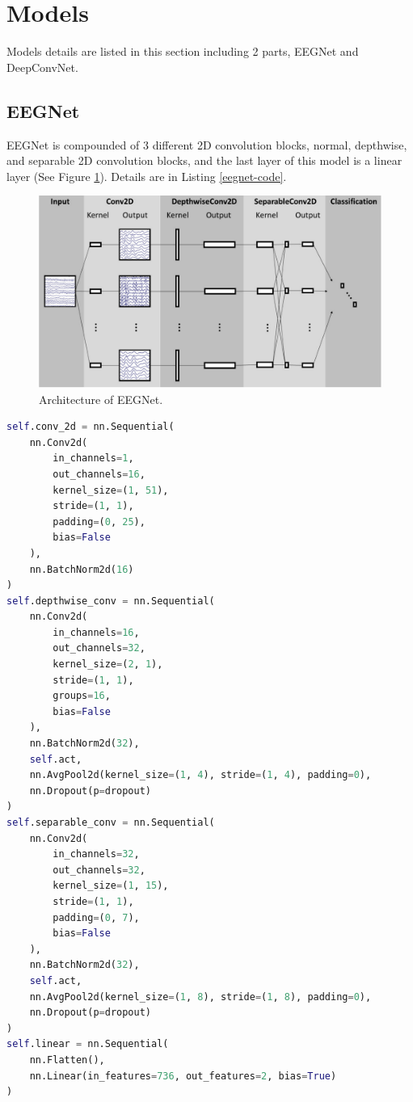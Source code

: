 \section{Models}
\indent
    Models details are listed in this section including 2 parts,
    EEGNet and DeepConvNet.

\subsection{EEGNet}
\indent
	EEGNet is compounded of 3 different 2D convolution blocks, 
	normal, depthwise, and separable 2D convolution blocks, and
	the last layer of this model is a linear layer (See Figure \ref{eegnet}). 
	Details are in Listing \ref{eegnet-code}.

	\begin{figure}[H]
		\centering
		\includegraphics[scale=0.5]{img/eegnet.png}
		\caption{Architecture of EEGNet.}
		\label{eegnet}
	\end{figure}
\pagebreak
\begin{lstlisting}[language=Python, caption={Python code of EEGNet.}, label={eegnet-code}]
self.conv_2d = nn.Sequential(
	nn.Conv2d(
		in_channels=1,
		out_channels=16,
		kernel_size=(1, 51),
		stride=(1, 1),
		padding=(0, 25),
		bias=False
	),
	nn.BatchNorm2d(16)
)
self.depthwise_conv = nn.Sequential(
	nn.Conv2d(
		in_channels=16,
		out_channels=32,
		kernel_size=(2, 1),
		stride=(1, 1),
		groups=16,
		bias=False
	),
	nn.BatchNorm2d(32),
	self.act,
	nn.AvgPool2d(kernel_size=(1, 4), stride=(1, 4), padding=0),
	nn.Dropout(p=dropout)
)
self.separable_conv = nn.Sequential(
	nn.Conv2d(
		in_channels=32,
		out_channels=32,
		kernel_size=(1, 15),
		stride=(1, 1),
		padding=(0, 7),
		bias=False
	),
	nn.BatchNorm2d(32),
	self.act,
	nn.AvgPool2d(kernel_size=(1, 8), stride=(1, 8), padding=0),
	nn.Dropout(p=dropout)
)
self.linear = nn.Sequential(
	nn.Flatten(),
	nn.Linear(in_features=736, out_features=2, bias=True)
)\end{lstlisting}
		
